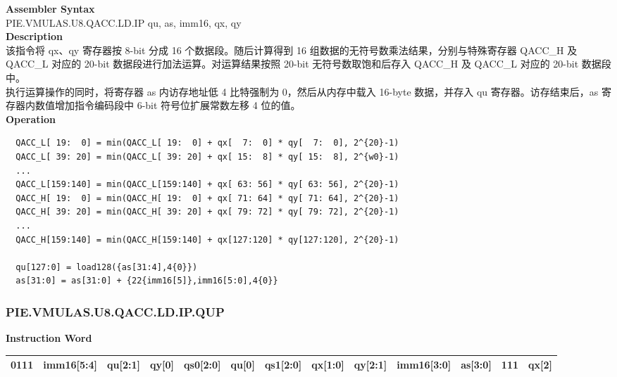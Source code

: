 \textbf{Assembler Syntax} \\
PIE.VMULAS.U8.QACC.LD.IP qu, as, imm16, qx, qy \\
\textbf{Description} \\
该指令将 qx、qy 寄存器按 8-bit 分成 16 个数据段。随后计算得到 16 组数据的无符号数乘法结果，分别与特殊寄存器 QACC\_H 及 QACC\_L 对应的 20-bit 数据段进行加法运算。对运算结果按照 20-bit 无符号数取饱和后存入 QACC\_H 及 QACC\_L 对应的 20-bit 数据段中。\\
执行运算操作的同时，将寄存器 as 内访存地址低 4 比特强制为 0，然后从内存中载入 16-byte 数据，并存入 qu 寄存器。访存结束后，as 寄存器内数值增加指令编码段中 6-bit 符号位扩展常数左移 4 位的值。\\
\textbf{Operation}
\begin{lstlisting}
  QACC_L[ 19:  0] = min(QACC_L[ 19:  0] + qx[  7:  0] * qy[  7:  0], 2^{20}-1)
  QACC_L[ 39: 20] = min(QACC_L[ 39: 20] + qx[ 15:  8] * qy[ 15:  8], 2^{w0}-1)
  ...
  QACC_L[159:140] = min(QACC_L[159:140] + qx[ 63: 56] * qy[ 63: 56], 2^{20}-1)
  QACC_H[ 19:  0] = min(QACC_H[ 19:  0] + qx[ 71: 64] * qy[ 71: 64], 2^{20}-1)
  QACC_H[ 39: 20] = min(QACC_H[ 39: 20] + qx[ 79: 72] * qy[ 79: 72], 2^{20}-1)
  ...
  QACC_H[159:140] = min(QACC_H[159:140] + qx[127:120] * qy[127:120], 2^{20}-1)

  qu[127:0] = load128({as[31:4],4{0}})
  as[31:0] = as[31:0] + {22{imm16[5]},imm16[5:0],4{0}}
\end{lstlisting}

\newpage
\subsubsection{PIE.VMULAS.U8.QACC.LD.IP.QUP}\label{instruction:PIEVMULASU8QACCLDIPQUP}
\setlength\tabcolsep{5pt}
\textbf{Instruction Word} \\
\begin{tabular}{|c|c|c|c|c|c|c|c|c|c|c|c|c|}
	\hline
	0111 & imm16[5:4] & qu[2:1] & qy[0] & qs0[2:0] & qu[0] & qs1[2:0] & qx[1:0] & qy[2:1] & imm16[3:0] & as[3:0] & 111 & qx[2] \\
	\hline
\end{tabular}

